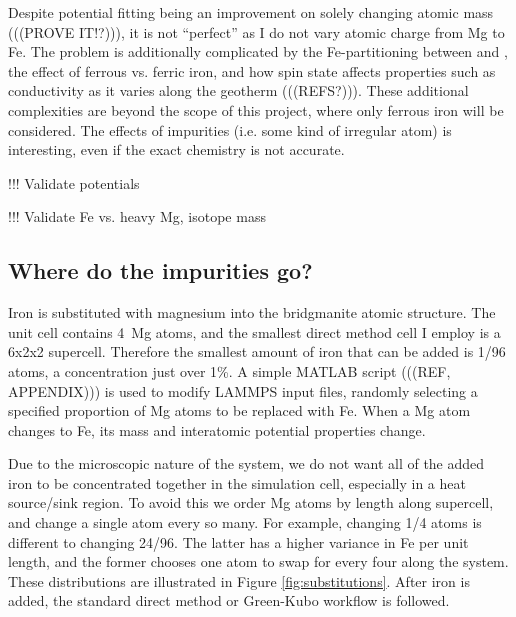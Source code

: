 Despite potential fitting being an improvement on solely changing atomic mass (((PROVE IT!?))), it is not ``perfect'' as I do not vary atomic charge from Mg to Fe. The problem is additionally complicated by the Fe-partitioning between \mgsios and \mgo, the effect of ferrous vs. ferric iron, and how spin state affects properties such as conductivity as it varies along the geotherm (((REFS?))). These additional complexities are beyond the scope of this project, where only ferrous iron will be considered. The effects of impurities (i.e. some kind of irregular atom) is interesting, even if the exact chemistry is not accurate.

!!! Validate potentials

!!! Validate Fe vs. heavy Mg, isotope mass

\subsection{Where do the impurities go?} 

Iron is substituted with magnesium into the bridgmanite atomic structure. The unit cell contains 4~Mg atoms, and the smallest direct method cell I employ is a 6x2x2 supercell. Therefore the smallest amount of iron that can be added is 1/96 atoms, a concentration just over 1\%. A simple MATLAB script (((REF, APPENDIX))) is used to modify LAMMPS input files, randomly selecting a specified proportion of Mg atoms to be replaced with Fe. When a Mg atom changes to Fe, its mass and interatomic potential properties change. 

Due to the microscopic nature of the system, we do not want all of the added iron to be concentrated together in the simulation cell, especially in a heat source/sink region. To avoid this we order Mg atoms by length along supercell, and change a single atom every so many. For example, changing 1/4 atoms is different to changing 24/96. The latter has a higher variance in Fe per unit length, and the former chooses one atom to swap for every four along the system. These distributions are illustrated in Figure \ref{fig:substitutions}. After iron is added, the standard direct method or Green-Kubo workflow is followed.

